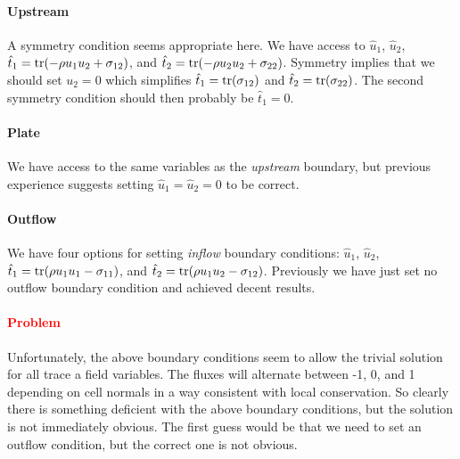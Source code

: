 \documentclass{article}
\begin{document}
\paragraph*{Upstream}
A symmetry condition seems appropriate here. We have access to $\hat u_1$, $\hat u_2$,
$\hat t_1=\operatorname*{tr}(-\rho u_1u_2+\sigma_{12})$, and $\hat t_2=\operatorname*{tr}(-\rho u_2u_2+\sigma_{22})$.
Symmetry implies that we should set $u_2=0$ which simplifies $\hat t_1=\operatorname*{tr}(\sigma_{12})$ and $\hat t_2=\operatorname*{tr}(\sigma_{22})$.
The second symmetry condition should then probably be $\hat t_1=0$.

\paragraph*{Plate}
We have access to the same variables as the \emph{upstream} boundary, but previous experience suggests setting $\hat u_1=\hat u_2=0$ to be correct.

\paragraph*{Outflow}
We have four options for setting \emph{inflow} boundary conditions: $\hat u_1$, $\hat u_2$,
$\hat t_1=\operatorname*{tr}(\rho u_1u_1-\sigma_{11})$, and $\hat t_2=\operatorname*{tr}(\rho u_1u_2-\sigma_{12})$.
Previously we have just set no outflow boundary condition and achieved decent results.

\paragraph*{\textcolor{red}{Problem}}
Unfortunately, the above boundary conditions seem to allow the trivial solution for all trace a field variables. 
The fluxes will alternate between -1, 0, and 1 depending on cell normals in a way consistent with local conservation. 
So clearly there is something deficient with the above boundary conditions, but the solution is not immediately obvious.
The first guess would be that we need to set an outflow condition, but the correct one is not obvious.

\end{document}
